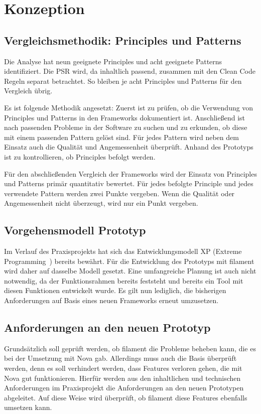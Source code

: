 
\newpage


\section{Konzeption}

\subsection{Vergleichsmethodik: Principles und Patterns}
Die Analyse hat neun geeignete Principles und acht geeignete Patterns identifiziert.
Die PSR wird, da inhaltlich passend, zusammen mit den Clean Code Regeln separat betrachtet.
So bleiben je acht Principles und Patterns für den Vergleich übrig.

Es ist folgende Methodik angesetzt:
Zuerst ist zu prüfen, ob die Verwendung von Principles und Patterns in den Frameworks dokumentiert ist.
Anschließend ist nach passenden Probleme in der Software zu suchen und zu erkunden, ob diese mit einem passenden Pattern gelöst sind.
Für jedes Pattern wird neben dem Einsatz auch die Qualität und Angemessenheit überprüft.
Anhand des Prototyps ist zu kontrollieren, ob Principles befolgt werden.

Für den abschließenden Vergleich der Frameworks wird der Einsatz von Principles und Patterns primär quantitativ bewertet.
Für jedes befolgte Principle und jedes verwendete Pattern werden zwei Punkte vergeben.
Wenn die Qualität oder Angemessenheit nicht überzeugt, wird nur ein Punkt vergeben.

\subsection{Vorgehensmodell Prototyp}
Im Verlauf des Praxisprojekts hat sich das Entwicklungsmodell XP (Extreme Programming~\cite{agile-prozesse}) bereits bewährt.
Für die Entwicklung des Prototyps mit filament wird daher auf dasselbe Modell gesetzt.
Eine umfangreiche Planung ist auch nicht notwendig, da der Funktionsrahmen bereits feststeht und bereits ein Tool mit diesen Funktionen entwickelt wurde.
Es gilt nun lediglich, die bisherigen Anforderungen auf Basis eines neuen Frameworks erneut umzusetzen.

\newpage

\subsection{Anforderungen an den neuen Prototyp}
Grundsätzlich soll geprüft werden, ob filament die Probleme beheben kann, die es bei der Umsetzung mit Nova gab.
Allerdings muss auch die Basis überprüft werden, denn es soll verhindert werden, dass Features verloren gehen, die mit Nova gut funktionieren.
Hierfür werden aus den inhaltlichen und technischen Anforderungen im Praxisprojekt die Anforderungen an den neuen Prototypen abgeleitet.
Auf diese Weise wird überprüft, ob filament diese Features ebenfalls umsetzen kann.

